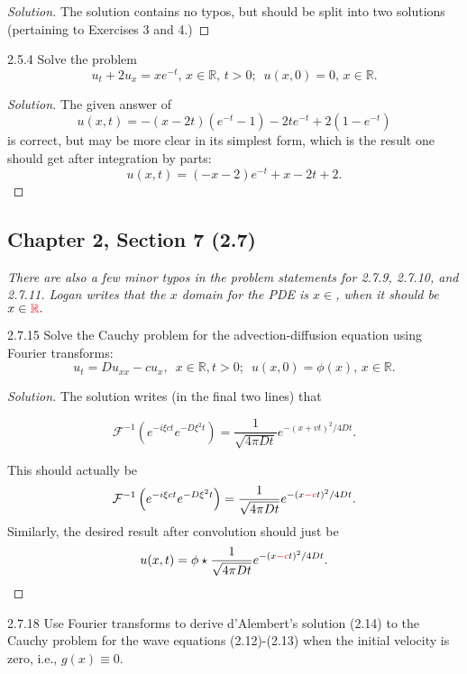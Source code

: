 \documentclass[11pt]{article}
\newenvironment{solution}
  {\renewcommand\qedsymbol{$\blacksquare$}\begin{proof}[Solution]}
  {\end{proof}}
\theoremstyle{definition}
\begin{document}
\begin{solution}
The solution contains no typos, but should be split into two solutions (pertaining to Exercises 3 and 4.)
\end{solution}

\begin{exercise}{2.5.4}
Solve the problem 
\[u_t +2u_x = xe^{-t}, \, x \in \mathbb{R}, \, t>0; \, \, \, u(x,0)=0, \, x \in \mathbb{R}.\]
\end{exercise}

\begin{solution}
The given answer of \[u(x, t) = -(x - 2t)(e^{-t} - 1) - 2te^{-t} + 2(1 - e
^{-t})\] is correct, but may be more clear in its simplest form, which is the result one should get after integration by parts:
\[ u(x, t) = (-x-2)e^{-t} + x - 2t + 2.\]
\end{solution}


\setcounter{subsection}{6}
\subsection{Chapter 2, Section 7 (2.7)}

\textit{There are also a few minor typos in the problem statements for 2.7.9, 2.7.10, and 2.7.11. Logan writes that the $x$ domain for the PDE is $x \in$, when it should be $x \in \textcolor{red}{\mathbb{R}}.$}

\begin{exercise}{2.7.15}
Solve the Cauchy problem for the advection-diffusion equation using Fourier transforms:
\[ u_t = Du_{xx} - cu_x, \, \, \, x\in \mathbb{R}, t > 0; \, \, \, u(x, 0) = \phi(x), \, x \in \mathbb{R}.\]
\end{exercise}

\begin{solution}
The solution writes (in the final two lines) that 

\[ \mathcal{F}^{-1}\left( e^{-i\xi ct}e^{-D\xi^2 t}\right) = \frac{1}{\sqrt{4\pi Dt}}e^{-(x+vt)^2/4Dt}. \]

This should actually be \[ \mathcal{F}^{-1}\left( e^{-i\xi ct}e^{-D\xi^2 t}\right) = \frac{1}{\sqrt{4\pi Dt}}e^{-(x\textcolor{red}{-c}t)^2/4Dt}. \]
Similarly, the desired result after convolution should just be 
\[ u(x, t) = \phi \star \frac{1}{\sqrt{4\pi Dt}}e^{-(x\textcolor{red}{-c}t)^2/4Dt}. \]
\end{solution}


\begin{exercise}{2.7.18}
  Use Fourier transforms to derive d'Alembert's solution (2.14) to the Cauchy problem for the wave equations 
  (2.12)-(2.13) when the initial velocity is zero, i.e., $g(x) \equiv 0$. 
\end{exercise}
\end{document}
